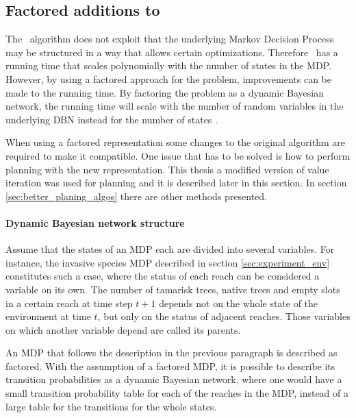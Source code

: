 \subsection{Factored additions to \etre}
\label{sec:factored_e3}

The \etre\ algorithm does not exploit that the underlying Markov Decision
Process may be structured in a way that allows certain optimizations. Therefore
\etre\ has a running time that scales polynomially with the number of states in
the MDP. However, by using a factored approach for the problem, improvements
can be made to the running time. By factoring the problem as a dynamic Bayesian
network, the running time will scale with the number of random variables in the
underlying DBN instead for the number of states
\parencite{kearns1999efficient}. 

When using a factored representation some changes to the original algorithm are
required to make it compatible. One issue that has to be solved is how to
perform  planning with the new representation. This thesis a modified version
of value iteration was used for planning and it is described later in this
section. In section \ref{sec:better_planing_algos} there are other methods
presented.


\paragraph{Dynamic Bayesian network structure}

Assume that the states of an MDP each are divided into several variables. For
instance, the invasive species MDP described in section
\ref{sec:experiment_env} constitutes such a case, where the status of each
reach can be considered a variable on its own. The number of tamarisk trees,
native trees and empty slots in a certain reach at time step $t+1$ depends not
on the whole state of the environment at time $t$, but only on the status of
adjacent reaches. Those variables on which another variable depend are called
its parents.  

An MDP that follows the description in the previous paragraph is described as
factored. With the assumption of a factored MDP, it is possible to describe its
transition probabilities as a dynamic Bayesian network, where one would have a
small transition probability table for each of the reaches in the MDP, instead
of a large table for the transitions for the whole states.
